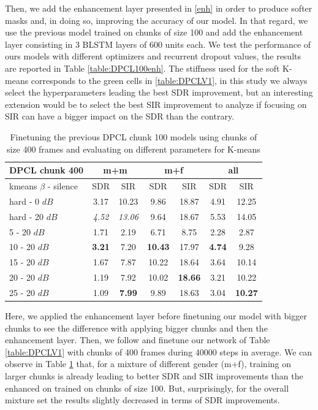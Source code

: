 \documentclass[master, tikz, final,11pt, dvipdfmx]{iscs-thesis}
\begin{document}
Then, we add the enhancement layer presented in \autoref{enh} in order to produce softer masks and, in doing so, improving the accuracy of our model. In that regard, we use the previous model trained on chunks of size 100 and add the enhancement layer consisting in 3 BLSTM layers of 600 units each. We test the performance of ours models with different optimizers and recurrent dropout values, the results are reported in Table \ref{table:DPCL100enh}. The stiffness used for the soft K-means corresponds to the green cells in \ref{table:DPCLV1}, in this study we always select the hyperparameters leading the best SDR improvement, but an interesting extension would be to select the best SIR improvement to analyze if focusing on SIR can have a bigger impact on the SDR than the contrary.

\begin{table}[h]
\centering
\begin{tabular}{l|c|c|c|c|c|c}
DPCL chunk 400 & \multicolumn{2}{c|}{m+m} & \multicolumn{2}{c|}{m+f} & \multicolumn{2}{c}{all} \\ 
\hline 
kmeans $\beta$ - silence & SDR & SIR & SDR & SIR & SDR & SIR \\ 
\hline 
hard - 0 $dB$ & 3.17 & 10.23  & 9.86 & 18.87 & 4.91 & 12.25 \\ 
hard - 20 $dB$ & \textit{4.52} & \textit{13.06} & 9.64 & 18.67 & 5.53 & 14.05 \\ 
\hline 
\hline 
5 - 20 $dB$ & 1.71 & 2.19 & 6.71 & 8.75 & 2.28 & 2.87 \\ 
10 - 20 $dB$ & \cellcolor{green}\textbf{3.21} & \cellcolor{green}7.20 & \cellcolor{green}\textbf{10.43} & \cellcolor{green}17.97 & \cellcolor{green}\textbf{4.74} & \cellcolor{green}9.28 \\ 
15 - 20 $dB$ & 1.67 & 7.87 & 10.22 & 18.64 & 3.64 & 10.14 \\ 
20 - 20 $dB$ & 1.19 & 7.92 & 10.02 & \textbf{18.66} & 3.21 & 10.22 \\ 
25 - 20 $dB$ & 1.09 & \textbf{7.99} & 9.89 & 18.63 & 3.04 & \textbf{10.27} \\ 
\end{tabular}
\captionsetup{justification=centering}
\caption{Finetuning the previous DPCL chunk 100 models using chunks of size 400 frames and evaluating on different parameters for K-means}
\label{table:DPCL400}
\end{table}

Here, we applied the enhancement layer before finetuning our model with bigger chunks to see the difference with applying bigger chunks and then the enhancement layer. 
Then, we follow \cite{DPCLV2} and finetune our network of Table \ref{table:DPCLV1} with chunks of 400 frames during 40000 steps in average. We can observe in Table \ref{table:DPCL400} that, for a mixture of different gender (m+f), training on larger chunks is already leading to better SDR and SIR improvements than the enhanced on trained on chunks of size 100. But, surprisingly, for the overall mixture set the results slightly decreased in terms of SDR improvements.
\end{document}
